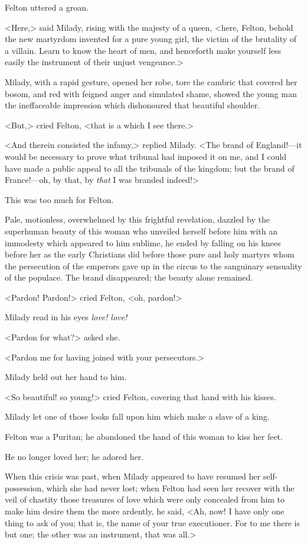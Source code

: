 Felton uttered a groan. 

<Here,> said Milady, rising with the majesty of a queen, <here, Felton, behold the new martyrdom invented for a pure young girl, the victim of the brutality of a villain. Learn to know the heart of men, and henceforth make yourself less easily the instrument of their unjust vengeance.> 

Milady, with a rapid gesture, opened her robe, tore the cambric that covered her bosom, and red with feigned anger and simulated shame, showed the young man the ineffaceable impression which dishonoured that beautiful shoulder. 

<But,> cried Felton, <that is a  which I see there.> 

<And therein consisted the infamy,> replied Milady. <The brand of England!—it would be necessary to prove what tribunal had imposed it on me, and I could have made a public appeal to all the tribunals of the kingdom; but the brand of France!—oh, by that, by \emph{that} I was branded indeed!> 

This was too much for Felton. 

Pale, motionless, overwhelmed by this frightful revelation, dazzled by the superhuman beauty of this woman who unveiled herself before him with an immodesty which appeared to him sublime, he ended by falling on his knees before her as the early Christians did before those pure and holy martyrs whom the persecution of the emperors gave up in the circus to the sanguinary sensuality of the populace. The brand disappeared; the beauty alone remained. 

<Pardon! Pardon!> cried Felton, <oh, pardon!> 

Milady read in his eyes \emph{love! love!} 

<Pardon for what?> asked she. 

<Pardon me for having joined with your persecutors.> 

Milady held out her hand to him. 

<So beautiful! so young!> cried Felton, covering that hand with his kisses. 

Milady let one of those looks fall upon him which make a slave of a king. 

Felton was a Puritan; he abandoned the hand of this woman to kiss her feet. 

He no longer loved her; he adored her. 

When this crisis was past, when Milady appeared to have resumed her self-possession, which she had never lost; when Felton had seen her recover with the veil of chastity those treasures of love which were only concealed from him to make him desire them the more ardently, he said, <Ah, now! I have only one thing to ask of you; that is, the name of your true executioner. For to me there is but one; the other was an instrument, that was all.> 

